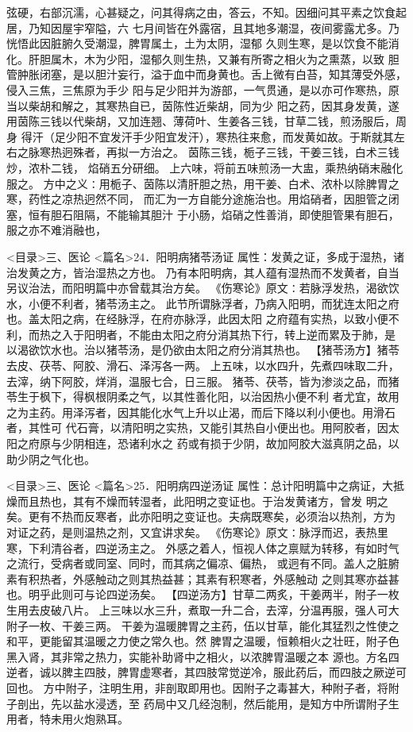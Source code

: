 \documentclass[a4paper,12pt,UTF8,twoside]{ctexbook}
\begin{document}
弦硬，右部沉濡，心甚疑之，问其得病之由，答云，不知。因细问其平素之饮食起居，乃知因屋宇窄隘，六 
七月间皆在外露宿，且其地多潮湿，夜间雾露尤多。乃恍悟此因脏腑久受潮湿，脾胃属土，土为太阴，湿郁 
久则生寒，是以饮食不能消化。肝胆属木，木为少阳，湿郁久则生热，又兼有所寄之相火为之熏蒸，以致 
胆管肿胀闭塞，是以胆汁妄行，溢于血中而身黄也。舌上微有白苔，知其薄受外感，侵入三焦，三焦原为手少 
阳与足少阳并为游部，一气贯通，是以亦可作寒热，原当以柴胡和解之，其寒热自已，茵陈性近柴胡，同为少 
阳之药，因其身发黄，遂用茵陈三钱以代柴胡，又加连翘、薄荷叶、生姜各三钱，甘草二钱，煎汤服后，周身 
得汗（足少阳不宜发汗手少阳宜发汗），寒热往来愈，而发黄如故。于斯就其左右之脉寒热迥殊者，再拟一方治之。 
茵陈三钱，栀子三钱，干姜三钱，白术三钱炒，浓朴二钱， 
焰硝五分研细。 
上六味，将前五味煎汤一大盅，乘热纳硝末融化服之。 
方中之义∶用栀子、茵陈以清肝胆之热，用干姜、白术、浓朴以除脾胃之寒，药性之凉热迥然不同， 
而汇为一方自能分途施治也。用焰硝者，因胆管之闭塞，恒有胆石阻隔，不能输其胆汁 
于小肠，焰硝之性善消，即使胆管果有胆石，服之亦不难消融也， 

<目录>三、医论
<篇名>24．阳明病猪苓汤证
属性：发黄之证，多成于湿热，诸治发黄之方，皆治湿热之方也。 
乃有本阳明病，其人蕴有湿热而不发黄者，自当另议治法，而阳明篇中亦曾载其治方矣。 
《伤寒论》原文∶若脉浮发热，渴欲饮水，小便不利者，猪苓汤主之。 
此节所谓脉浮者，乃病入阳明，而犹连太阳之府也。盖太阳之病，在经脉浮，在府亦脉浮，此因太阳 
之府蕴有实热，以致小便不利，而热之入于阳明者，不能由太阳之府分消其热下行，转上逆而累及于肺，是 
以渴欲饮水也。治以猪苓汤，是仍欲由太阳之府分消其热也。 
【猪苓汤方】猪苓去皮、茯苓、阿胶、滑石、泽泻各一两。 
上五味，以水四升，先煮四味取二升，去滓，纳下阿胶，烊消，温服七合，日三服。 
猪苓、茯苓，皆为渗淡之品，而猪苓生于枫下，得枫根阴柔之气，以其性善化阳，以治因热小便不利 
者尤宜，故用之为主药。用泽泻者，因其能化水气上升以止渴，而后下降以利小便也。用滑石者，其性可 
代石膏，以清阳明之实热，又能引其热自小便出也。用阿胶者，因太阳之府原与少阴相连，恐诸利水之 
药或有损于少阴，故加阿胶大滋真阴之品，以助少阴之气化也。 

<目录>三、医论
<篇名>25．阳明病四逆汤证
属性：总计阳明篇中之病证，大抵燥而且热也，其有不燥而转湿者，此阳明之变证也。于治发黄诸方，曾发 
明之矣。更有不热而反寒者，此亦阳明之变证也。夫病既寒矣，必须治以热剂，方为 
对证之药，是则温热之剂，又宜讲求矣。 
《伤寒论》原文∶脉浮而迟，表热里寒，下利清谷者，四逆汤主之。 
外感之着人，恒视人体之禀赋为转移，有如时气之流行，受病者或同室、同时，而其病之偏凉、偏热， 
或迥有不同。盖人之脏腑素有积热者，外感触动之则其热益甚；其素有积寒者，外感触动 
之则其寒亦益甚也。明乎此则可与论四逆汤矣。 
【四逆汤方】甘草二两炙，干姜两半，附子一枚生用去皮破八片。 
上三味以水三升，煮取一升二合，去滓，分温再服，强人可大附子一枚、干姜三两。 
干姜为温暖脾胃之主药，伍以甘草，能化其猛烈之性使之和平，更能留其温暖之力使之常久也。然 
脾胃之温暖，恒赖相火之壮旺，附子色黑入肾，其非常之热力，实能补助肾中之相火，以浓脾胃温暖之本 
源也。方名四逆者，诚以脾主四肢，脾胃虚寒者，其四肢常觉逆冷，服此药后，而四肢之厥逆可回也。 
方中附子，注明生用，非剖取即用也。因附子之毒甚大，种附子者，将附子剖出，先以盐水浸透，至 
药局中又几经泡制，然后能用，是知方中所谓附子生用者，特未用火炮熟耳。 
\end{document}
